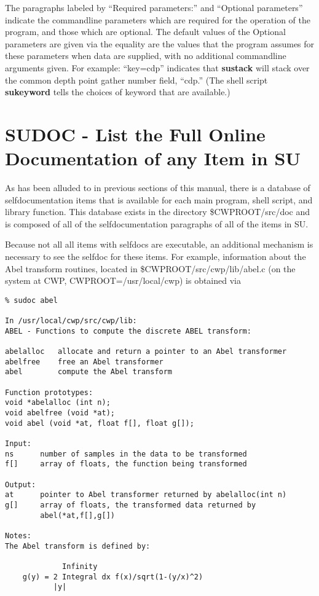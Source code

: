 {{The paragraphs labeled by ``Required parameters:'' and ``Optional parameters''
indicate the commandline parameters which are required for the operation
of the program, and those which are optional. The default values of
the Optional parameters are given via the equality  are the values that the program assumes
for these parameters when data are supplied,  with no additional commandline
arguments given. For example: ``key=cdp'' indicates that {\bf sustack\/} will
stack over the common depth point gather number field, ``cdp.''
(The shell script {\bf sukeyword\/} tells the choices of keyword that
are available.) 

\section{SUDOC - List the Full Online Documentation of any Item in SU}
As has been alluded to in previous sections of this manual, there
is a database of selfdocumentation items that is available for each
main program, shell script, and library function.
This database exists in the directory \$CWPROOT/src/doc  and is
composed of all of the selfdocumentation paragraphs of all of the
items in SU.

Because not all all items with selfdocs are executable, an additional
mechanism is necessary to see the selfdoc for these items.
For example, information about the Abel transform routines, located in
\$CWPROOT/src/cwp/lib/abel.c (on the system at CWP,
 CWPROOT=/usr/local/cwp) is obtained via

{\small\begin{verbatim}
% sudoc abel

In /usr/local/cwp/src/cwp/lib: 
ABEL - Functions to compute the discrete ABEL transform:

abelalloc	allocate and return a pointer to an Abel transformer
abelfree 	free an Abel transformer
abel		compute the Abel transform

Function prototypes:
void *abelalloc (int n);
void abelfree (void *at);
void abel (void *at, float f[], float g[]);

Input:
ns		number of samples in the data to be transformed
f[]		array of floats, the function being transformed

Output:
at		pointer to Abel transformer returned by abelalloc(int n)
g[]		array of floats, the transformed data returned by 
		abel(*at,f[],g[])

Notes:
The Abel transform is defined by:

	         Infinity
	g(y) = 2 Integral dx f(x)/sqrt(1-(y/x)^2)
		   |y|


\end{verbatim}}}}
